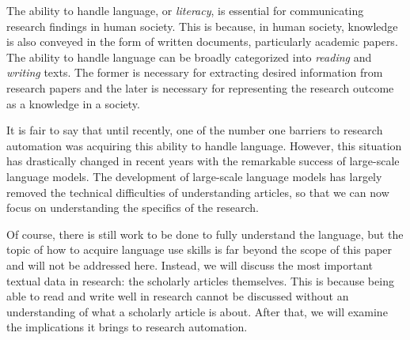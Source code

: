 \documentclass{book}
\begin{document}
The ability to handle language, or \textit{literacy}, is essential for communicating research findings in human society. This is because, in human society, knowledge is also conveyed in the form of written documents, particularly academic papers. The ability to handle language can be broadly categorized into \textit{reading} and \textit{writing} texts. The former is necessary for extracting desired information from research papers and the later is necessary for representing the research outcome as a knowledge in a society.

It is fair to say that until recently, one of the number one barriers to research automation was acquiring this ability to handle language. However, this situation has drastically changed in recent years with the remarkable success of large-scale language models. The development of large-scale language models has largely removed the technical difficulties of understanding articles, so that we can now focus on understanding the specifics of the research.

Of course, there is still work to be done to fully understand the language, but the topic of how to acquire language use skills is far beyond the scope of this paper and will not be addressed here. Instead, we will discuss the most important textual data in research: the scholarly articles themselves. This is because being able to read and write well in research cannot be discussed without an understanding of what a scholarly article is about. After that, we will examine the implications it brings to research automation.



\end{document}
